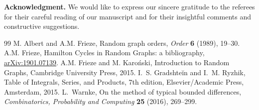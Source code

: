 \documentclass[12pt,reqno]{amsart}
\theoremstyle{remark}
\begin{document}
\bigskip
\textbf{Acknowledgment.}
We would like to express our sincere gratitude to the referees for their careful reading of our manuscript and for their insightful comments and constructive suggestions.

\begin{thebibliography}{99}
 M. Albert and A.M. Frieze, Random graph orders, {\em Order} \textbf{6} (1989), 19--30.
%
 A.M. Frieze, Hamilton Cycles in Random Graphs: a bibliography, \href{https://arxiv.org/abs/1901.07139}{arXiv:1901.07139}.
%
 A.M. Frieze and M. Karo\'nski, Introduction to Random Graphs, Cambridge University Press, 2015.
%
 I.~S. Gradshte\u in and I.~M. Ryzhik, Table of Integrals, Series, and Products, 7th edition, 
Elsevier/Academic Press, Amsterdam, 2015.
%
 L.~Warnke, On the method of typical bounded differences, {\em Combinatorics, Probability and Computing} \textbf{25} (2016), 269--299.

\end{thebibliography}
\end{document}
